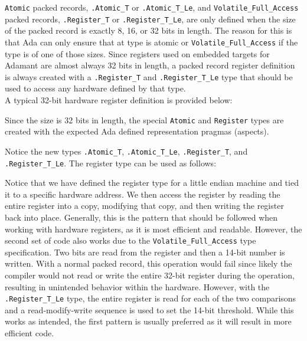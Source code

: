 \texttt{Atomic} packed records, \texttt{.Atomic\_T} or \texttt{.Atomic\_T\_Le}, and \texttt{Volatile\_Full\_Access} packed records, \texttt{.Register\_T} or \texttt{.Register\_T\_Le}, are only defined when the size of the packed record is exactly 8, 16, or 32 bits in length. The reason for this is that Ada can only ensure that at type is atomic or \texttt{Volatile\_Full\_Access} if the type is of one of those sizes. Since registers used on embedded targets for Adamant are almost always 32 bits in length, a packed record register definition is always created with a \texttt{.Register\_T} and \texttt{.Register\_T\_Le} type that should be used to access any hardware defined by that type. \\

A typical 32-bit hardware register definition is provided below:


Since the size is 32 bits in length, the special \texttt{Atomic} and \texttt{Register} types are created with the expected Ada defined representation pragmas (aspects).


Notice the new types \texttt{.Atomic\_T}, \texttt{.Atomic\_T\_Le}, \texttt{.Register\_T}, and \texttt{.Register\_T\_Le}. The register type can be used as follows:


Notice that we have defined the register type for a little endian machine and tied it to a specific hardware address. We then access the register by reading the entire register into a copy, modifying that copy, and then writing the register back into place. Generally, this is the pattern that should be followed when working with hardware registers, as it is most efficient and readable. However, the second set of code also works due to the \texttt{Volatile\_Full\_Access} type specification. Two bits are read from the register and then a 14-bit number is written. With a normal packed record, this operation would fail since likely the compiler would not read or write the entire 32-bit register during the operation, resulting in unintended behavior within the hardware. However, with the \texttt{.Register\_T\_Le} type, the entire register is read for each of the two comparisons and a read-modify-write sequence is used to set the 14-bit threshold. While this works as intended, the first pattern is usually preferred as it will result in more efficient code.

